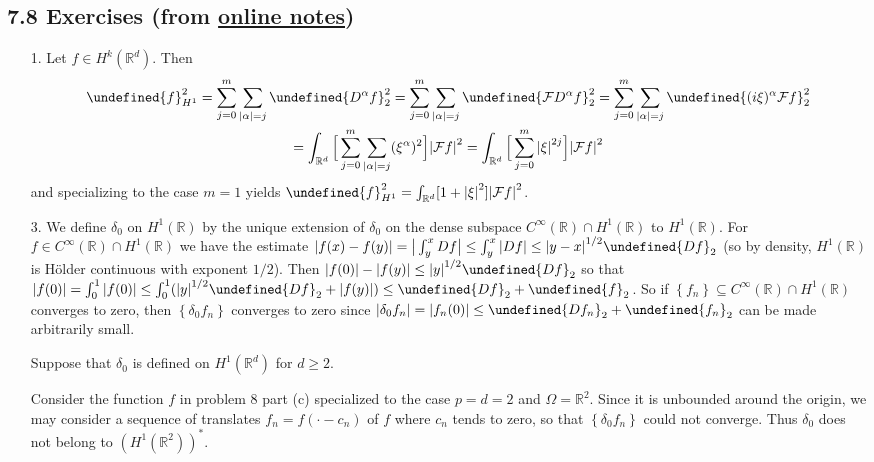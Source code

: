\documentclass[11pt,leqno]{article}
\theoremstyle{plain}
\theoremstyle{definition}
\numberwithin{equation}{section}
\numberwithin{lem}{section}
\newcommand{\cbr}[1]{\left\{#1\right\}}
\let\norm\undefined %
\DeclarePairedDelimiter\norm{\lVert}{\rVert}
\begin{document}
\subsection*{7.8 Exercises (from \href{https://users.oden.utexas.edu/~arbogast/appMath08c.pdf}{online notes})}
\begin{enumerate}
    \item[1.] Let $f\in H^k(\mathbb R^d)$. Then 
    \begin{multline*}
        \norm{f}_{H^1}^2 = \sum_{j=0}^m\sum_{\abs{\alpha} = j}\norm{D^\alpha f}_2^2 = \sum_{j=0}^m\sum_{\abs{\alpha} = j}\norm{\mathcal FD^\alpha f}_2^2 = \sum_{j=0}^m\sum_{\abs{\alpha} = j}\norm{(i\xi)^\alpha \mathcal F f}_2^2 \\ = \int_{\mathbb R^d}\Big[\sum_{j=0}^m\sum_{\abs{\alpha} = j}(\xi^\alpha)^2\Big]\abs{\mathcal Ff}^2 = \int_{\mathbb R^d}\Big[\sum_{j=0}^m\abs{\xi}^{2j}\Big]\abs{\mathcal Ff}^2
    \end{multline*} and specializing to the case $m = 1$ yields $\norm{f}_{H^1}^2 = \int_{\mathbb R^d}[1+\abs{\xi}^{2}]\abs{\mathcal Ff}^2$.
    \item[3.] We define $\delta_0$ on $H^1(\mathbb R)$ by the unique extension of $\delta_0$ on the dense subspace $C^\infty(\mathbb R)\cap H^1(\mathbb R)$ to $H^1(\mathbb R)$. For $f\in C^\infty(\mathbb R)\cap H^1(\mathbb R)$ we have the estimate $\abs{f(x)-f(y)} = \big|\int_y^xDf\big|\leq \int_y^x\abs{Df}\leq \abs{y-x}^{1/2}\norm{Df}_2$ (so by density, $H^1(\mathbb R)$ is H\"older continuous with exponent $1/2$). Then $\abs{f(0)} - \abs{f(y)}\leq \abs{y}^{1/2}\norm{Df}_2$ so that $\abs{f(0)} = \int_0^1\abs{f(0)}\leq \int_0^1(\abs{y}^{1/2}\norm{Df}_2 + \abs{f(y)})\leq \norm{Df}_2 + \norm{f}_2$. So if $\cbr{f_n}\subseteq C^\infty(\mathbb R)\cap H^1(\mathbb R)$ converges to zero, then $\cbr{\delta_0f_n}$ converges to zero since $\abs{\delta_0f_n} = \abs{f_n(0)}\leq \norm{Df_n}_2 + \norm{f_n}_2$ can be made arbitrarily small.
    
    Suppose that $\delta_0$ is defined on $H^1(\mathbb R^d)$ for $d\geq 2$.
    
    Consider the function $f$ in problem 8 part (c) specialized to the case $p = d = 2$ and $\Omega = \mathbb R^2$. Since it is unbounded around the origin, we may consider a sequence of translates $f_n = f(\cdot - c_n)$ of $f$ where $c_n$ tends to zero, so that $\cbr{\delta_0f_n}$ could not converge. Thus $\delta_0$ does not belong to $(H^1(\mathbb R^2))^\ast$.


\end{enumerate}
\end{document}
